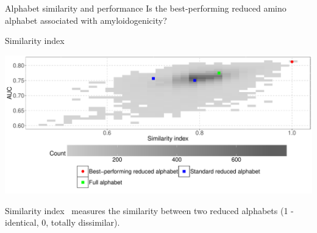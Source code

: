 \documentclass{beamer}\usepackage[]{graphicx}\usepackage[]{color}
\makeatletter
\def\maxwidth{ %
  \ifdim\Gin@nat@width>\linewidth
    \linewidth
  \else
    \Gin@nat@width
  \fi
}
\newenvironment{knitrout}{}{} %
\makeatother
\begin{document}


\begin{frame}{Alphabet similarity and performance}
Is the best-performing reduced amino alphabet associated with amyloidogenicity?
\end{frame}

\begin{frame}{Similarity index}
\begin{knitrout}
\color{fgcolor}

{\centering \includegraphics[width=\maxwidth]{figure/unnamed-chunk-6-1} 

}



\end{knitrout}
Similarity index~\citep{stephenson_unearthing_2013} measures the similarity between two reduced alphabets (1 - identical, 0, totally dissimilar).
\end{frame}
\end{document}
